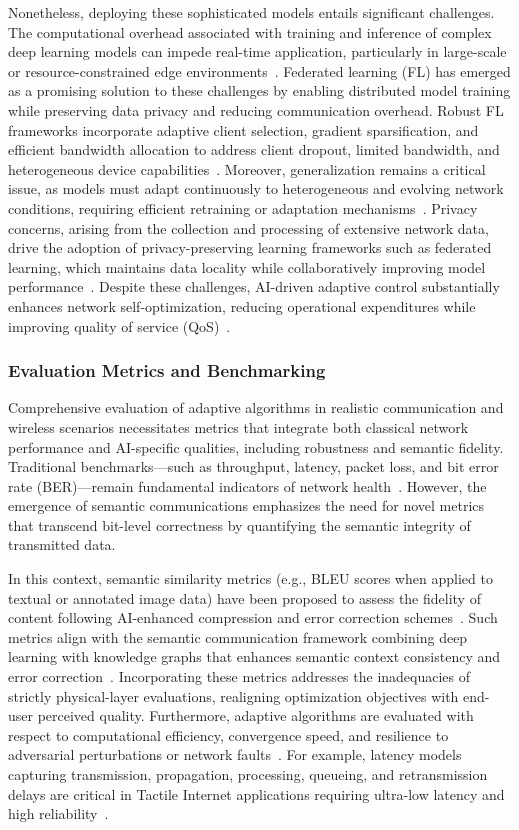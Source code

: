 \documentclass[sigconf]{acmart}
\begin{document}
Nonetheless, deploying these sophisticated models entails significant challenges. The computational overhead associated with training and inference of complex deep learning models can impede real-time application, particularly in large-scale or resource-constrained edge environments~\cite{ref4,ref5}. Federated learning (FL) has emerged as a promising solution to these challenges by enabling distributed model training while preserving data privacy and reducing communication overhead. Robust FL frameworks incorporate adaptive client selection, gradient sparsification, and efficient bandwidth allocation to address client dropout, limited bandwidth, and heterogeneous device capabilities~\cite{ref4,ref5}. Moreover, generalization remains a critical issue, as models must adapt continuously to heterogeneous and evolving network conditions, requiring efficient retraining or adaptation mechanisms~\cite{ref7}. Privacy concerns, arising from the collection and processing of extensive network data, drive the adoption of privacy-preserving learning frameworks such as federated learning, which maintains data locality while collaboratively improving model performance~\cite{ref10,ref11}. Despite these challenges, AI-driven adaptive control substantially enhances network self-optimization, reducing operational expenditures while improving quality of service (QoS)~\cite{ref14,ref50}.

\subsubsection{Evaluation Metrics and Benchmarking}

Comprehensive evaluation of adaptive algorithms in realistic communication and wireless scenarios necessitates metrics that integrate both classical network performance and AI-specific qualities, including robustness and semantic fidelity. Traditional benchmarks---such as throughput, latency, packet loss, and bit error rate (BER)---remain fundamental indicators of network health~\cite{ref3,ref5}. However, the emergence of semantic communications emphasizes the need for novel metrics that transcend bit-level correctness by quantifying the semantic integrity of transmitted data.

In this context, semantic similarity metrics (e.g., BLEU scores when applied to textual or annotated image data) have been proposed to assess the fidelity of content following AI-enhanced compression and error correction schemes~\cite{ref1,ref3,ref50}. Such metrics align with the semantic communication framework combining deep learning with knowledge graphs that enhances semantic context consistency and error correction~\cite{ref1}. Incorporating these metrics addresses the inadequacies of strictly physical-layer evaluations, realigning optimization objectives with end-user perceived quality. Furthermore, adaptive algorithms are evaluated with respect to computational efficiency, convergence speed, and resilience to adversarial perturbations or network faults~\cite{ref5,ref7,ref10}. For example, latency models capturing transmission, propagation, processing, queueing, and retransmission delays are critical in Tactile Internet applications requiring ultra-low latency and high reliability~\cite{ref10}.
\end{document}
